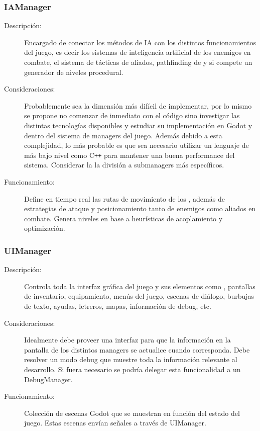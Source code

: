 \subsubsection{IAManager}\label{modelado:iamanager}
\begin{description}
	\item[Descripción:] Encargado de conectar los métodos de IA con los distintos funcionamientos del juego, es decir los sistemas de inteligencia artificial de los enemigos en combate, el sistema de tácticas de aliados, pathfinding de  y si compete un generador de niveles procedural. 
	
	\item[Consideraciones:] Probablemente sea la dimensión más difícil de implementar, por lo mismo se propone no comenzar de inmediato con el código sino investigar las distintas tecnologías disponibles y estudiar su implementación en Godot y dentro del sistema de managers del juego. Además debido a esta complejidad, lo más probable es que sea necesario utilizar un lenguaje de más bajo nivel como C\texttt{++} para mantener una buena performance del sistema. Considerar la la división a submanagers más específicos.
	
	\item[Funcionamiento:] Define en tiempo real las rutas de movimiento de los , además de estrategias de ataque y posicionamiento tanto de enemigos como aliados en combate. Genera niveles en base a heurísticas de acoplamiento y optimización.
\end{description}
	
\subsubsection{UIManager}\label{modelado:uimanager}
	\begin{description}
	\item[Descripción:] Controla toda la interfaz gráfica del juego y sus elementos como , pantallas de inventario, equipamiento, menús del juego, escenas de diálogo, burbujas de texto, ayudas, letreros, mapas, información de debug, etc.
	
	\item[Consideraciones:] Idealmente debe proveer una interfaz para que la información en la pantalla de los distintos managers se actualice cuando corresponda. Debe resolver un modo debug que muestre toda la información relevante al desarrollo. Si fuera necesario se podría delegar esta funcionalidad a un DebugManager.
	
	\item[Funcionamiento:] Colección de escenas Godot que se muestran en función del estado del juego. Estas escenas envían señales a través de UIManager.
\end{description}
	
